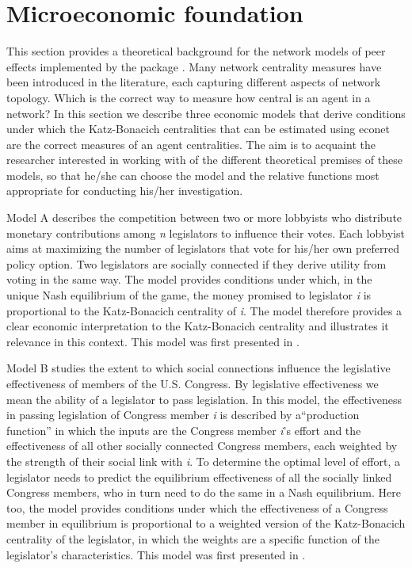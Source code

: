 \documentclass[nojss]{jss}
\begin{document}
\section{Microeconomic foundation} \label{sec:theory}
This section provides a theoretical background for the network models of peer effects implemented by the  package . Many network centrality measures have been introduced in the literature, each capturing different aspects of network topology. Which is the correct way to measure how central is an agent in a network? In this section we describe three economic models that derive conditions under which the Katz-Bonacich centralities that can be estimated using econet are the correct measures of an agent centralities. The aim is to acquaint the researcher interested in working with  of the different theoretical premises of these models, so that he/she can choose the model and the relative  functions most appropriate for conducting his/her investigation.

Model A describes the competition between two or more lobbyists who distribute monetary contributions among \textit{n} legislators to influence their votes. Each lobbyist aims at maximizing the number of legislators that vote for his/her own preferred policy option. Two legislators are socially connected if they derive utility from voting in the same way. The model provides conditions under which, in the unique Nash equilibrium of the game, the money promised to legislator \textit{i} is proportional to the Katz-Bonacich centrality of \textit{i}. The model therefore provides a clear economic interpretation to the Katz-Bonacich centrality and illustrates it relevance in this context. This model was first presented in \cite{Battaglini+Patacchini:2018}.

Model B studies the extent to which social connections influence the legislative effectiveness of members of the U.S. Congress. By legislative effectiveness we mean the ability of a legislator to pass legislation. In this model, the effectiveness in passing legislation of Congress member \textit{i} is described by a``production function'' in which the inputs are the Congress member \textit{i}'s effort and the effectiveness of all other socially connected Congress members, each weighted by the strength of their social link with \textit{i}. To determine the optimal level of effort, a legislator needs to predict the equilibrium effectiveness of all the socially linked Congress members, who in turn need to do the same in a Nash equilibrium. Here too, the model provides conditions under which the effectiveness of a Congress member in equilibrium is proportional to a weighted version of the Katz-Bonacich centrality of the legislator, in which the weights are a specific function of the legislator's characteristics. This model was first presented in \cite{Battaglini+Sciabolazza+Patacchini:2020}.
\end{document}
